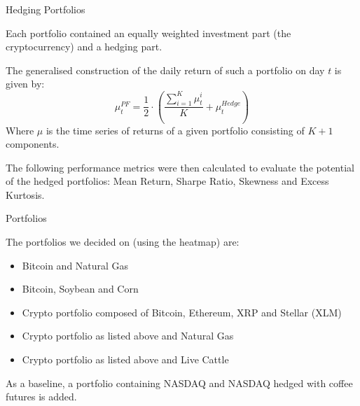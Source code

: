 \begin{frame}{Hedging Portfolios}
    \begin{block}{}
     Each portfolio contained an equally weighted investment part (the cryptocurrency) and a hedging part.
    \end{block}   
    \begin{alertblock}{}
The generalised construction of the daily return of such a portfolio on day $t$ is given by:
\begin{equation} \label{eq:pfform}
\mu_t^{PF} = \frac{1}{2} \cdot \left( \frac{\sum_{i=1}^K{\mu_{t}^{i}}}{K} + \mu_{t}^{Hedge} \right)
\end{equation}
Where $\mu$ is the time series of returns of a given portfolio consisting of $K+1$ components. 
    \end{alertblock} 
    \begin{block}{}
The following performance metrics were then calculated to evaluate the potential of the hedged portfolios: Mean Return, Sharpe Ratio, Skewness and Excess Kurtosis.
    \end{block} 

\end{frame}

\begin{frame}{Portfolios}
    \begin{block}{}
The portfolios we decided on (using the heatmap) are:
\begin{itemize}
    \item Bitcoin and Natural Gas
    \item Bitcoin, Soybean and Corn
    \item Crypto portfolio composed of Bitcoin, Ethereum, XRP and Stellar (XLM)
    \item Crypto portfolio as listed above and Natural Gas
    \item Crypto portfolio as listed above and Live Cattle
\end{itemize}
\end{block}

\begin{alertblock}{}
As a baseline, a portfolio containing NASDAQ and NASDAQ hedged with coffee futures is added.
\end{alertblock}
\end{frame}